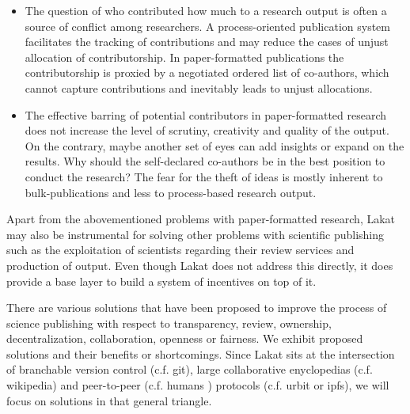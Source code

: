 \begin{itemize}
\item 
The question of who contributed how much to a research output is often a source of conflict among researchers. A process-oriented publication system facilitates the tracking of contributions and may reduce the cases of unjust allocation of contributorship. In paper-formatted publications the contributorship is proxied by a negotiated ordered list of co-authors, which cannot capture contributions and inevitably leads to unjust allocations. 

\item The effective barring of potential contributors in paper-formatted research does not increase the level of scrutiny, creativity and quality of the output. On the contrary, maybe another set of eyes can add insights or expand on the results. Why should the self-declared co-authors be in the best position to conduct the research? The fear for the theft of ideas is mostly inherent to bulk-publications and less to process-based research output. 
\end{itemize}

Apart from the abovementioned problems with paper-formatted research, Lakat may also be instrumental for solving other problems with scientific publishing such as the exploitation of scientists regarding their review services and production of output. Even though Lakat does not address this directly, it does provide a base layer to build a system of incentives on top of it. 

There are various solutions that have been proposed to improve the process of science publishing with respect to transparency, review, ownership, decentralization, collaboration, openness or fairness. We exhibit proposed solutions and their benefits or shortcomings. Since Lakat sits at the intersection of branchable version control (c.f. git\cite{}), large collaborative enyclopedias (c.f. wikipedia\cite{}) and peer-to-peer (c.f. humans \cite{}) protocols (c.f. urbit \cite{} or ipfs\cite{}), we will focus on solutions in that general triangle.

